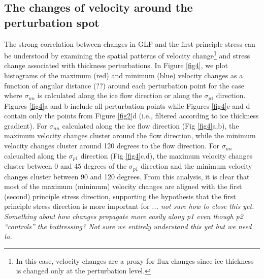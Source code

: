 \documentclass[review,oneside]{igs}
\begin{document}
\subsection{The changes of velocity around the perturbation spot}

The strong correlation between changes in GLF and the first principle stress can be understood by examining the spatial patterns of velocity change\footnote{In this case, velocity changes are a proxy for flux changes since ice thickness is changed only at the perturbation level.} and stress change associated with thickness perturbations. %
In Figure \ref{fig4}, we plot histograms of the maximum (red) and minimum (blue) velocity changes as a function of angular distance (??) around each perturbation point for the case where $\sigma_{nn}$ is calculated along the ice flow direction or along the $\sigma_{p1}$ direction. Figures \ref{fig4}a and b include all perturbation points while Figures \ref{fig4}c and d contain only the points from Figure \ref{fig2}d (i.e., filtered according to ice thickness gradient). For $\sigma_{nn}$ calculated along the ice flow direction (Fig \ref{fig4}a,b), the maximum velocity changes cluster around the flow direction, while the minimum velocity changes cluster around 120 degrees to the flow direction. For $\sigma_{nn}$ calcualted along the $\sigma_{p1}$ direction (Fig \ref{fig4}c,d), the maximum velocity changes cluster between 0 and 45 degrees of the $\sigma_{p1}$ direction and the minimum velocity changes cluster between 90 and 120 degrees. From this analysis, it is clear that most of the maximum (minimum) velocity changes are aligned with the first (second) principle stress direction, supporting the hypothesis that the first principle stress direction is more important for \textit{... not sure how to close this yet. Something about how changes propagate more easily along p1 even though p2 ``controls'' the buttressing? Not sure we entirely understand this yet but we need to}.
\end{document}
